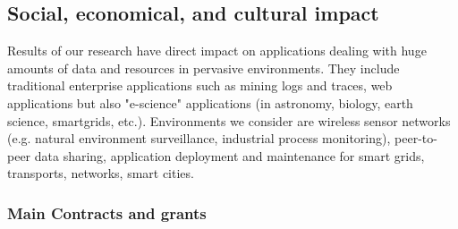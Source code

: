 \subsection{Social, economical, and cultural impact} %
\label{sub:hadas_social_economical_and_cultural_impact}

Results of our research have direct impact on applications dealing with huge amounts of data and resources in pervasive environments. 
They include traditional enterprise applications such as mining logs and traces, web applications but also "e-science" applications (in astronomy, biology, earth science, smartgrids, etc.). 
Environments we consider are wireless sensor networks (e.g. natural environment surveillance, industrial process monitoring), peer-to-peer data sharing, application deployment and maintenance for smart grids, transports, networks, smart cities.  

\subsubsection{Main Contracts and grants}
\label{hadas_contracts}


